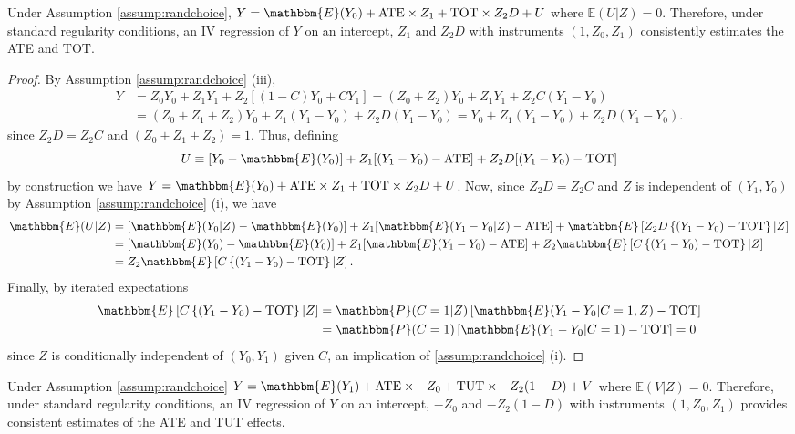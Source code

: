 \begin{prop} 
\label{prop:TOTreg}
Under Assumption \ref{assump:randchoice}, $Y = \mathbbm{E}(Y_0) + \text{ATE}\times Z_1 + \text{TOT} \times Z_2 D + U$ where $\mathbb{E}(U|Z) = 0$.
Therefore, under standard regularity conditions, an IV regression of $Y$ on an intercept, $Z_1$ and $Z_2 D$ with instruments $(1, Z_0, Z_1)$ consistently estimates the ATE and TOT. 
\end{prop}

\begin{proof}
By Assumption \ref{assump:randchoice} (iii),
\begin{align*}
Y &= Z_0 Y_0 + Z_1 Y_1 + Z_2[(1 - C) Y_0 + CY_1] = (Z_0 + Z_2)Y_0 + Z_1 Y_1 + Z_2C(Y_1 - Y_0)\\
&= (Z_0 + Z_1 + Z_2)Y_0 + Z_1 (Y_1 - Y_0) + Z_2D(Y_1 - Y_0) = Y_0 + Z_1 (Y_1 - Y_0) + Z_2D(Y_1 - Y_0).
\end{align*}
since $Z_2 D = Z_2 C$ and $(Z_0 + Z_1 + Z_2) = 1$.
Thus, defining 
\[
U \equiv [Y_0 - \mathbbm{E}(Y_0)] + Z_1[(Y_1 - Y_0) - \text{ATE}] + Z_2 D[(Y_1 - Y_0) - \text{TOT}]
\]
by construction we have $Y = \mathbbm{E}(Y_0) + \text{ATE} \times Z_1 + \text{TOT} \times Z_2 D+ U$.
Now, since $Z_2 D = Z_2 C$ and $Z$ is independent of $(Y_1, Y_0)$ by Assumption \ref{assump:randchoice} (i), we have
\begin{align*}
\mathbbm{E}(U|Z) &= [\mathbbm{E}(Y_0|Z) - \mathbbm{E}(Y_0)]  + Z_1[\mathbbm{E}(Y_1 - Y_0|Z) - \text{ATE}] +  \mathbbm{E}\left[Z_2 D\left\{(Y_1 - Y_0) - \text{TOT}\right\}|Z\right]\\
&= [\mathbbm{E}(Y_0) - \mathbbm{E}(Y_0)]  + Z_1[\mathbbm{E}(Y_1 - Y_0) - \text{ATE}] + Z_2 \mathbbm{E}\left[C\left\{(Y_1 - Y_0) - \text{TOT}\right\}|Z\right]\\
&= Z_2 \mathbbm{E}\left[C\left\{(Y_1 - Y_0) - \text{TOT}\right\}|Z\right].
\end{align*}
Finally, by iterated expectations
\begin{align*}
\mathbbm{E}\left[C\left\{(Y_1 - Y_0) - \text{TOT}\right\}|Z\right] &=  \mathbbm{P}(C=1|Z) \left[\mathbbm{E}(Y_1 - Y_0|C=1,Z)  - \text{TOT}\right]\\
&= \mathbbm{P}(C=1)\left[\mathbbm{E}(Y_1 - Y_0|C=1) - \text{TOT} \right]=0
\end{align*}
since $Z$ is conditionally independent of $(Y_0, Y_1)$ given $C$, an implication of \ref{assump:randchoice} (i).
\end{proof}

\begin{prop}
\label{prop:TUTreg}
Under Assumption \ref{assump:randchoice} $Y = \mathbbm{E}(Y_1) + \text{ATE}\times -Z_0 + \text{TUT} \times -Z_2 (1 - D) + V$ where $\mathbb{E}(V|Z) = 0$.
Therefore, under standard regularity conditions, an IV regression of $Y$ on an intercept, $-Z_0$ and $-Z_2(1-D)$ with instruments $(1, Z_0, Z_1)$ provides consistent estimates of the ATE and TUT effects.
\end{prop}

